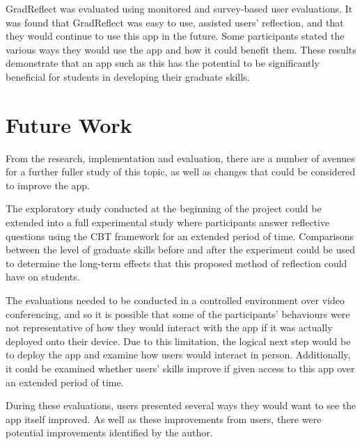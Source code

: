 \documentclass{l4proj}
\begin{document}
GradReflect was evaluated using monitored and survey-based user evaluations. It was found that GradReflect was easy to use, assisted users’ reflection, and that they would continue to use this app in the future. Some participants stated the various ways they would use the app and how it could benefit them. These results demonstrate that an app such as this has the potential to be significantly beneficial for students in developing their graduate skills.

\section{Future Work} \label{Concl_futureWork}

From the research, implementation and evaluation, there are a number of avenues for a further fuller study of this topic, as well as changes that could be considered to improve the app. 

The exploratory study conducted at the beginning of the project could be extended into a full experimental study where participants answer reflective questions using the CBT framework for an extended period of time. Comparisons between the level of graduate skills before and after the experiment could be used to determine the long-term effects that this proposed method of reflection could have on students. 

The evaluations needed to be conducted in a controlled environment over video conferencing, and so it is possible that some of the participants’ behaviours were not representative of how they would interact with the app if it was actually deployed onto their device. Due to this limitation, the logical next step would be to deploy the app and examine how users would interact in person. Additionally, it could be examined whether users’ skills improve if given access to this app over an extended period of time.

During these evaluations, users presented several ways they would want to see the app itself improved. As well as these improvements from users, there were potential improvements identified by the author.
\end{document}
